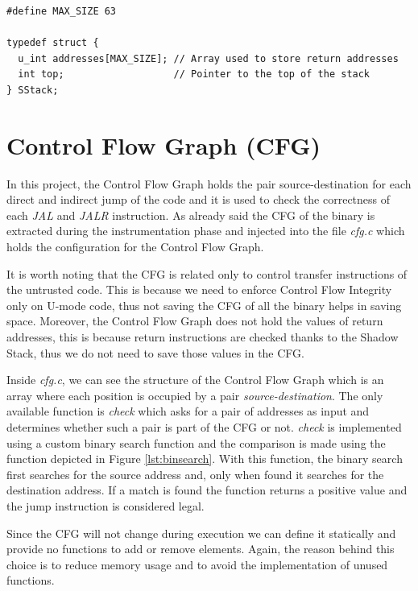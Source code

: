 \begin{lstlisting}[style=CStyle, caption = Shadow Stack definition inside \textit{shadow\_stack.c}, label={lst:ss}]
#define MAX_SIZE 63

typedef struct {
  u_int addresses[MAX_SIZE]; // Array used to store return addresses
  int top;                   // Pointer to the top of the stack
} SStack;
\end{lstlisting}

\section{Control Flow Graph (CFG)}
\label{sec:project_cfg}

In this project, the Control Flow Graph holds the pair source-destination for
each direct and indirect jump of the code and it is used to check the
correctness of each \textit{JAL} and \textit{JALR} instruction. As already said the
CFG of the binary is extracted during the instrumentation phase and injected into
the file \textit{cfg.c} which holds the configuration for the Control Flow Graph.

It is worth noting that the CFG is related only to control transfer instructions
of the untrusted code. This is because we need to enforce Control Flow Integrity
only on U-mode code, thus not saving the CFG of all the binary helps in saving
space. Moreover, the Control Flow Graph does not hold the values of return
addresses, this is because return instructions are checked thanks to the Shadow Stack,
thus we do not need to save those values in the CFG.

Inside \textit{cfg.c}, we can see the structure of the Control Flow Graph which
is an array where each position is occupied by a pair \textit{source-destination}.
The only available function is \textit{check} which asks for a pair of addresses
as input and determines whether such a pair is part of the CFG or not. \textit{check}
is implemented using a custom binary search function and the comparison is made using
the function depicted in Figure \ref{lst:binsearch}. With this function, the binary
search first searches for the source address and, only when found it searches
for the destination address. If a match is found the function returns a positive
value and the jump instruction is considered legal.

Since the CFG will not change during execution we can define it statically and provide
no functions to add or remove elements. Again, the reason behind this choice is to
reduce memory usage and to avoid the implementation of unused functions.

